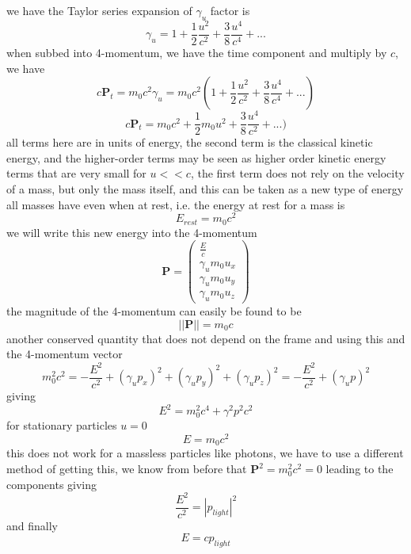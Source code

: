 we have the Taylor series expansion of $\gamma_u$ factor is
\begin{equation}
    \gamma_u = 1 + \frac{1}{2}\frac{u^2}{c^2} + \frac{3}{8}\frac{u^4}{c^4} + ...
\end{equation}
when subbed into 4-momentum, we have the time component and multiply by $c$, we have 
\begin{equation}
   c \mathbf{P}_t = m_0 c^2\gamma_u = m_0 c^2 ( 1 + \frac{1}{2}\frac{u^2}{c^2} +\frac{3}{8}\frac{u^4}{c^4} + ... ) 
\end{equation}
\begin{equation}
   c \mathbf{P}_t = m_0 c^2  + \frac{1}{2} m_0 u^2  + \frac{3}{8}\frac{u^4}{c^2} + ... ) 
\end{equation}
all terms here are in units of energy, the second term is the classical kinetic energy, and the higher-order terms may be seen as higher order kinetic energy terms that are very small for $u<<c$, the first term does not rely on the velocity of a mass, but only the mass itself, and this can be taken as a new type of energy all masses have even when at rest, i.e. the energy at rest for a mass is
\begin{equation}
    E_{rest} = m_0 c^2 
\end{equation}
we will write this new energy into the 4-momentum
\begin{equation}
    \mathbf{P} = \begin{pmatrix}
         \frac{E}{c} \\ \gamma_u m_0 u_x \\ \gamma_u m_0 u_y \\ \gamma_u m_0 u_z
     \end{pmatrix}
\end{equation}
the magnitude of the 4-momentum can easily be found to be
\begin{equation}
    ||\mathbf{P}|| = m_0 c
\end{equation}
another conserved quantity that does not depend on the frame and using this and the 4-momentum vector
\begin{equation}
    m^2_0 c^2 = - \frac{E^2}{c^2}  + (\gamma_u p_x)^2 + (\gamma_u p_y)^2 + (\gamma_u p_z)^2 = - \frac{E^2}{c^2}  + (\gamma_u p)^2
\end{equation}
giving
\begin{equation}
    E^2 = m_0^2c^4 +\gamma^2p^2c^2
\end{equation}
for stationary particles $u=0$
\begin{equation}
    E = m_0c^2 
\end{equation}
this does not work for a massless particles like photons, we have to use a different method of getting this, we know from before that $ \mathbf{P}^2 = m_0^2 c^2 = 0$ leading to the components giving
\begin{equation}
    \frac{E^2}{c^2} = |p_{light}|^2
\end{equation}
and finally
\begin{equation}
    E = c p_{light}
\end{equation}

